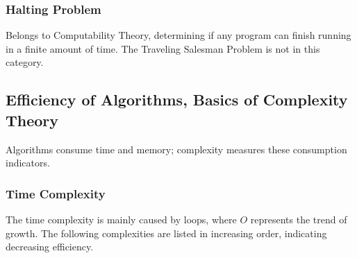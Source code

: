 \documentclass[11pt,journal,compsoc]{IEEEtran}
\begin{document}
\subsubsection{Halting Problem}

Belongs to Computability Theory, determining if any program can finish running in a finite amount of time. The Traveling Salesman Problem is not in this category.


\subsection{Efficiency of Algorithms, Basics of Complexity Theory}

Algorithms consume time and memory; complexity measures these consumption indicators.


\subsubsection{Time Complexity}

The time complexity is mainly caused by loops, where \(O\) represents the trend of growth. The following complexities are listed in increasing order, indicating decreasing efficiency.
\end{document}
